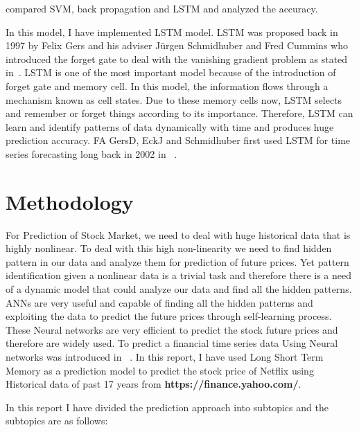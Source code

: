 \documentclass[5p,,preprint,12pt,twocolumn]{elsarticle}
\begin{document}
compared SVM, back propagation and LSTM and analyzed the accuracy.

In this model, I have implemented LSTM model. LSTM was proposed back in 1997 by Felix Gers and his adviser J{\"{u}}rgen Schmidhuber and Fred Cummins who introduced the forget gate to deal with the vanishing gradient problem as stated in\unskip~\cite{489105:11003510}. LSTM is one of the most important model because of the introduction of forget gate and memory cell. In this model, the information flows through a mechanism known as cell states. Due to these memory cells now, LSTM selects and remember or forget things according to its importance. Therefore, LSTM can learn and identify patterns of data dynamically with time and produces huge prediction accuracy.  FA GersD, EckJ and Schmidhuber first used LSTM for time series forecasting long back in 2002 in \unskip~\cite{489105:11003511}.
    
\section{Methodology}
For Prediction of Stock Market, we need to deal with huge historical data that is highly nonlinear. To deal with this high non-linearity we need to find hidden pattern in our data and analyze them for prediction of future prices. Yet pattern identification given a nonlinear data is a trivial task and therefore there is a need of a dynamic model that could analyze our data and find all the hidden patterns. ANNs are very useful and capable of finding all the hidden patterns and exploiting the data to predict the future prices through self-learning process. These Neural networks are very efficient to predict the stock future prices and therefore are widely used. To predict a financial time series data Using Neural networks was introduced in \unskip~\cite{489105:11003512}. In this report, I have used Long Short Term Memory as a prediction model to predict the stock price of Netflix using Historical data of past 17 years from \textbf{https://finance.yahoo.com/}.

In this report I have divided the prediction approach into  subtopics and the subtopics are as follows:
\end{document}
